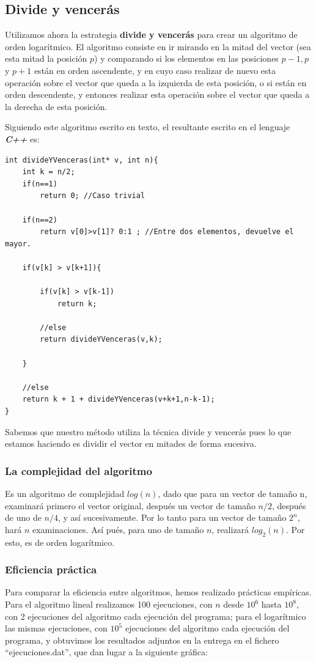 \documentclass[a4paper, 11pt]{article}
\begin{document}
\subsection{Divide y vencerás}
Utilizamos ahora la estrategia \textbf{divide y vencerás} para crear un algoritmo de orden logarítmico. El algoritmo consiste en ir mirando en la mitad del vector (sea esta mitad la posición $p$) y comparando si los elementos en las posiciones $p-1,p$ y $p+1$ están en orden ascendente, y en cuyo caso realizar de nuevo esta operación sobre el vector que queda a la izquierda de esta posición, o si están en orden descendente, y entonces realizar esta operación sobre el vector que queda a la derecha de esta posición.

Siguiendo este algoritmo escrito en texto, el resultante escrito en el lenguaje \emph{\textbf{C++}} es:
\begin{lstlisting}
int divideYVenceras(int* v, int n){
	int k = n/2;
	if(n==1)
		return 0; //Caso trivial
	
	if(n==2)
		return v[0]>v[1]? 0:1 ; //Entre dos elementos, devuelve el mayor.

	if(v[k] > v[k+1]){

		if(v[k] > v[k-1]) 
			return k;

		//else
		return divideYVenceras(v,k);

	}

	//else
	return k + 1 + divideYVenceras(v+k+1,n-k-1);
}

\end{lstlisting}

Sabemos que nuestro método utiliza la técnica divide y vencerás pues lo que estamos haciendo es dividir el vector en mitades de forma sucesiva.

\subsubsection{La complejidad del algoritmo}
Es un algoritmo de complejidad $log(n)$, dado que para un vector de tamaño n, examinará primero el vector original, después un vector de tamaño $n/2$, después de uno de $n/4$, y así sucesivamente. Por lo tanto para un vector de tamaño $2^n$, hará $n$ examinaciones. Así pués, para uno de tamaño $n$, realizará $log_2(n)$. Por esto, es de orden logarítmico.

\subsubsection{Eficiencia práctica}
Para comparar la eficiencia entre algoritmos, hemos realizado prácticas empíricas. Para el algoritmo lineal realizamos 100 ejecuciones, con $n$ desde $10^6$ hasta $10^8$, con 2 ejecuciones del algoritmo cada ejecución del programa; para el logarítmico las mismas ejecuciones, con $10^5$ ejecuciones del algoritmo cada ejecución del programa, y obtuvimos los resultados adjuntos en la entrega en el fichero ``ejecuciones.dat'', que dan lugar a la siguiente gráfica:
\end{document}
